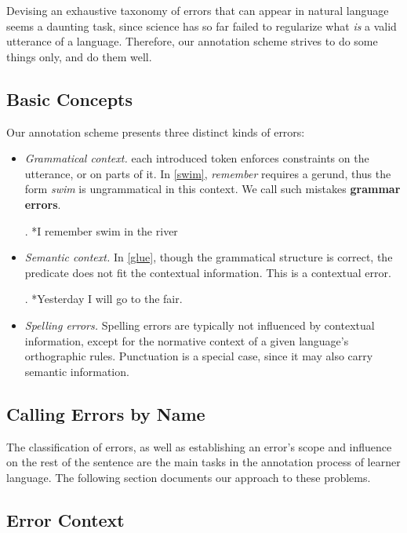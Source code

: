 \documentclass[12pt]{article}
\begin{document}
Devising an exhaustive taxonomy of errors that can appear in natural language
seems a daunting task, since science has so far failed to regularize what
\textit{is} a valid utterance of a language.  Therefore, our annotation scheme
strives  to  do some things only, and do them well.

\subsection{Basic Concepts}\label{sec:threeholies}

Our annotation scheme presents three distinct kinds of errors:

\begin{itemize}
  \item \textit{Grammatical context.} each introduced token enforces constraints
  on the utterance, or on parts of it. In \ref{swim}, \textit{remember} requires
  a gerund, thus the form \textit{swim} is ungrammatical in this context. We
  call such mistakes \textbf{grammar errors}.

  \ex. *I remember swim in the river\label{swim}

  \item \textit{Semantic context.}  In \ref{glue}, though the grammatical
  structure is correct, the predicate does not fit the contextual information.
  This is a contextual error.

  \ex. *Yesterday I will go to the fair.\label{glue}

  \item \textit{Spelling errors.} Spelling errors are typically not influenced
  by contextual information, except for the normative context of a given
  language's orthographic rules. Punctuation is a special case, since it may
  also carry semantic information.

  \end{itemize}

\subsection{Calling Errors by Name}\label{sec:taxonomy}

The classification of errors, as well as establishing an error's scope and 
influence on the rest of the sentence are the main tasks in the annotation
process of learner language. The following section documents our approach to
these problems.

\subsection{Error Context}
\end{document}
